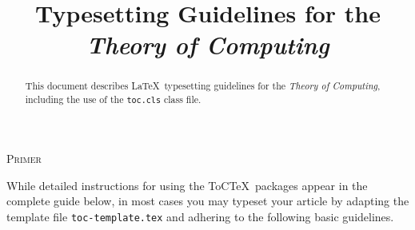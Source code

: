\documentclass{article}
\theoremstyle{plain}
\theoremstyle{definition}
\begin{document}
\title{Typesetting Guidelines for the\\ \textsl{Theory of Computing}}

\maketitle

\begin{abstract}
  This document describes \LaTeX\ typesetting guidelines for the
  \emph{Theory of Computing}, including the use of the
  \texttt{toc.cls} class file.
\end{abstract}

\begin{center}
\Large{\textsc{Primer}}
\end{center}

While detailed instructions for using the ToC\TeX\ packages appear in
the complete guide below, in most cases you may typeset your article by
adapting the template file \lstinline`toc-template.tex` and adhering to the
following basic guidelines.
\end{document}

